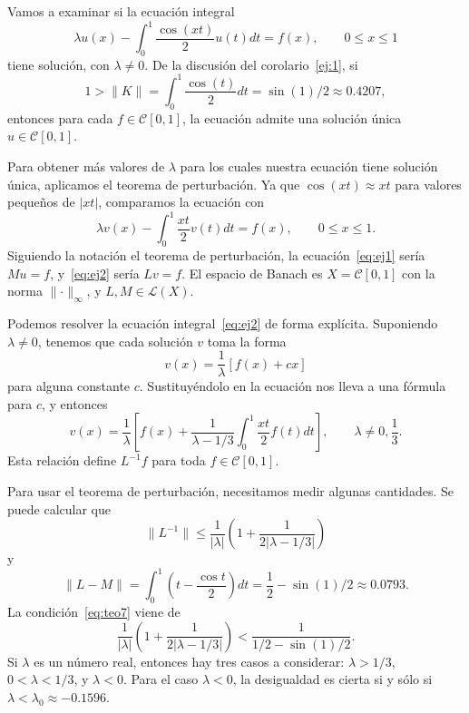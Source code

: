 \begin{ejemplo}
	Vamos a examinar si la ecuación integral
	\begin{equation}\label{eq:ej1}
		\lambda u(x) - \int_{0}^{1} \dfrac{\cos(xt)}{2}u(t)dt = f(x), \qquad 0 \leqslant x \leqslant 1
	\end{equation}
	tiene solución, con $\lambda \neq 0$. De la discusión del corolario~\eqref{ej:1}, si
	\begin{equation}\label{ej:2}
	1 > \lVert K \rVert = \int_{0}^{1}\dfrac{\cos(t)}{2}dt = \sin (1)/2 \approx 0.4207,
	\end{equation}
	entonces para cada $f \in \mathcal{C}[0,1]$, la ecuación admite una solución única $u \in \mathcal{C}[0,1]$.
	
	Para obtener más valores de $\lambda$ para los cuales nuestra ecuación tiene solución única, aplicamos el teorema de perturbación. Ya que $\cos(xt) \approx xt$ para valores pequeños de $|xt|$, comparamos la ecuación con
	\begin{equation}\label{eq:ej2}
		\lambda v(x) - \int_{0}^{1} \dfrac{xt}{2}v(t)dt = f(x), \qquad 0 \leqslant x \leqslant 1.
	\end{equation}
	Siguiendo la notación el teorema de perturbación, la ecuación~\eqref{eq:ej1} sería $Mu = f$, y~\eqref{eq:ej2} sería $Lv = f$. El espacio de Banach es $X = \mathcal{C}[0,1]$ con la norma $\lVert \cdot \rVert_\infty$, y $L,M \in \mathcal{L}(X)$.
	
	Podemos resolver la ecuación integral~\eqref{eq:ej2} de forma explícita. Suponiendo $\lambda \neq 0$, tenemos que cada solución $v$ toma la forma
	\begin{equation}
		v(x) = \dfrac{1}{\lambda}[f(x)+cx]
	\end{equation}
	para alguna constante $c$. Sustituyéndolo en la ecuación nos lleva a una fórmula para $c$, y entonces
	\begin{equation}
		v(x) = \dfrac{1}{\lambda}[f(x) + \dfrac{1}{\lambda - 1/3}\int_{0}^{1}\dfrac{xt}{2}f(t)dt], \qquad \lambda \neq 0,\dfrac{1}{3}.
	\end{equation}
	Esta relación define $L^{-1}f$ para toda $f \in \mathcal{C}[0,1]$.
	
	Para usar el teorema de perturbación, necesitamos medir algunas cantidades. Se puede calcular que
	\begin{equation}
		\lVert L^{-1} \rVert \leqslant \dfrac{1}{|\lambda|}(1 + \dfrac{1}{2|\lambda - 1/3|})
	\end{equation}
	y
	\begin{equation}
		\lVert L-M \rVert = \int_{0}^{1} (t - \dfrac{\cos t}{2})dt = \dfrac{1}{2} - \sin(1)/2 \approx 0.0793.
	\end{equation}
	La condición~\eqref{eq:teo7} viene de
	\begin{equation}\label{ej:3}
		\dfrac{1}{|\lambda|}(1+\dfrac{1}{2|\lambda - 1/3|}) < \dfrac{1}{1/2 - \sin(1)/2}.
	\end{equation}
	Si $\lambda$ es un número real, entonces hay tres casos a considerar: $\lambda > 1/3$, $0 < \lambda < 1/3$, y $\lambda < 0$. Para el caso $\lambda < 0$, la desigualdad es cierta si y sólo si $\lambda < \lambda_0 \approx -0.1596$.
	

\end{ejemplo}
